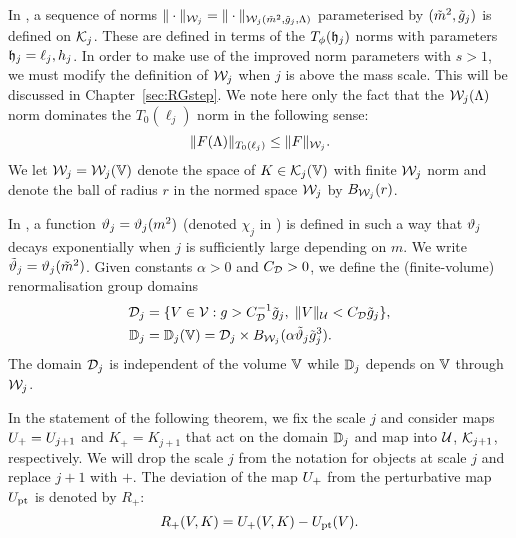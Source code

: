 In \cite[Section~\ref{step-sec:Knorms}]{BS-rg-step},
a sequence of norms $\|\cdot\|_{\mathcal{W}_j} = \|\cdot\|_{\mathcal{W}_j(\tilde{m}^2, \tilde{g}_j, \Lambda)}$
parameterised by $(\tilde{m}^2, \tilde{g}_j)$ is defined on $\mathcal{K}_j$.
These are defined in terms of the $T_\phi(\mathfrak{h}_j)$ norms with parameters $\mathfrak{h}_j = \ell_j, h_j$.
In order to make use of the improved norm parameters with $s > 1$,
we must modify the definition of $\mathcal{W}_j$ when $j$ is above the mass scale.
This will be discussed in Chapter~\ref{sec:RGstep}.
We note here only the fact that the $\mathcal{W}_j(\Lambda)$
norm dominates the $T_0(\ell_j)$ norm in the following sense:
\begin{equation}
\label{e:T0dom}
\|F(\Lambda)\|_{T_0(\ell_j)} \le \|F\|_{\mathcal{W}_j}.
\end{equation}
We let $\mathcal{W}_j = \mathcal{W}_j(\mathbb{V})$ denote the space of $K\in\mathcal{K}_j(\mathbb{V})$ with
finite $\mathcal{W}_j$ norm and
denote the ball of radius $r$ in the normed space $\mathcal{W}_j$ by $B_{\mathcal{W}_j}(r)$.

In \cite[\eqref{log-e:mass-scale}--\eqref{log-e:chidef}]{BBS-saw4-log},
a function $\vartheta_j = \vartheta_j(m^2)$ (denoted $\chi_j$ in \cite{BBS-saw4-log})
is defined in such a way that $\vartheta_j$ decays exponentially
when $j$ is sufficiently large depending on $m$. We write $\tilde{\vartheta}_j = \vartheta_j(\tilde{m}^2)$.
Given constants $\alpha > 0$ and $C_{\mathcal{D}} > 0$, we define the (finite-volume)
renormalisation group domains
\begin{align}
\label{e:DVdef}
\mathcal{D}_j
	&=
\{ V\in \mathcal{V} :
	g > C_{\mathcal{D}}^{-1} \tilde{g}_j, \; \|V\|_{\mathcal{U}} < C_{\mathcal{D}} \tilde{g}_j \}, \\
\label{e:domRG}
\mathbb{D}_j
	&= \mathbb{D}_j(\mathbb{V})
	= \mathcal{D}_j \times B_{\mathcal{W}_j}(\alpha \tilde{\vartheta}_j \tilde{g}_j^3).
\end{align}
The domain $\mathcal{D}_j$ is independent of the volume $\mathbb{V}$ while $\mathbb{D}_j$
depends on $\mathbb{V}$ through $\mathcal{W}_j$.

In the statement of the following theorem, we fix the scale $j$ and
consider maps $U_+ = U_{j+1}$ and $K_+ = K_{j+1}$ that act on the domain
$\mathbb{D}_j$ and map into $\mathcal{U}$, $\mathcal{K}_{j+1}$, respectively.
We will drop the scale $j$ from the notation for objects at scale $j$
and replace $j + 1$ with $+$.
The deviation of the map $U_+$ from the perturbative map $U_{\rm pt}$
is denoted by $R_+$:
\begin{equation}
\label{e:Rplusdef}
    R_+(V,K) = U_+(V,K) -U_{\rm pt}(V).
\end{equation}

